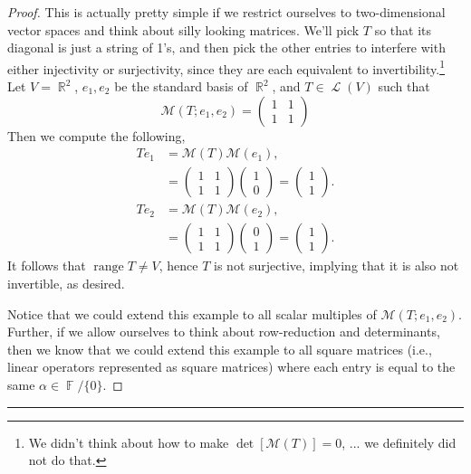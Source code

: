 \documentclass[letterpaper, 12pt]{amsart}
\DeclareMathOperator{\R}{\mathbb{R}}				%
\DeclareMathOperator{\F}{\mathbb{F}}				%
\DeclareMathOperator{\Ell}{\mathscr{L}}				%
\DeclareMathOperator{\range}{\text{range }}			%
\theoremstyle{definition}  							%
\begin{document}
		\begin{proof}
		This is actually pretty simple if we restrict ourselves to two-dimensional vector spaces and think about silly looking matrices.
		We'll pick $T$ so that its diagonal is just a string of 1's, and then pick the other entries to interfere with either injectivity or surjectivity, since they are each equivalent to invertibility.\footnote{We didn't think about how to make $\det{\left[ \mathcal{M}(T) \right]} = 0$, ... we definitely did not do that.}
		Let $V = \R^{2}$, $e_{1},e_{2}$ be the standard basis of $\R^2$, and $T \in \Ell(V)$ such that $$\mathcal{M}(T; e_{1},e_{2}) = \begin{pmatrix} 1 & 1 \\ 1 & 1 \end{pmatrix}$$
		Then we compute the following,
			\begin{align*}
				Te_{1} &= \mathcal{M}(T)\mathcal{M}(e_{1}), \\
				&= \begin{pmatrix} 1 & 1 \\ 1 & 1 \end{pmatrix} \begin{pmatrix} 1 \\ 0 \end{pmatrix} = \begin{pmatrix} 1 \\ 1 \end{pmatrix}. \\
				Te_{2} &= \mathcal{M}(T)\mathcal{M}(e_{2}), \\
				&= \begin{pmatrix} 1 & 1 \\ 1 & 1 \end{pmatrix} \begin{pmatrix} 0 \\ 1 \end{pmatrix} = \begin{pmatrix} 1 \\ 1 \end{pmatrix}.
			\end{align*}
		It follows that $\range T \neq V$, hence $T$ is not surjective, implying that it is also not invertible, as desired.

		Notice that we could extend this example to all scalar multiples of $\mathcal{M}(T; e_{1},e_{2})$.
		Further, if we allow ourselves to think about row-reduction and determinants, then we know that we could extend this example to all square matrices (i.e., linear operators represented as square matrices) where each entry is equal to the same $\alpha \in \F/\{0\}$.
		\end{proof}
		\vspace*{2mm}
		\hrule
		\vspace*{2mm}
\end{document}
